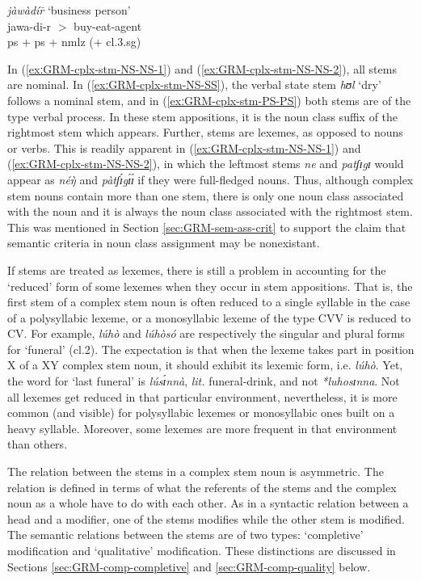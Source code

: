 \begin{exe}
\begin{exe}
\begin{exe}
{\begin{exe}
\begin{exe}
\begin{exe}
\begin{exe}
 \ex\label{exːGRM-cplx-stm-PS-PS}
 {\it jàwàdír̄} {\rm  `business person'} \\ %
jawa-di-r  $>$ {\sc buy-eat-agent} \\  %
 {\sc ps} + {\sc ps} + {\sc nmlz} (+ {\sc cl.3.sg})

 
\z 
 \z



In (\ref{exːGRM-cplx-stm-NS-NS-1}) and (\ref{exːGRM-cplx-stm-NS-NS-2}),  all 
stems are nominal. In (\ref{exːGRM-cplx-stm-NS-SS}),  the verbal state stem {\it 
hʊl} `dry'  follows a nominal stem,  and  in  (\ref{exːGRM-cplx-stm-PS-PS}) both 
stems are of the type verbal process.  In these stem appositions, it is the noun 
class suffix of the rightmost stem which appears. Further, stems are lexemes, as 
opposed to nouns or verbs.  This is readily apparent in  
(\ref{exːGRM-cplx-stm-NS-NS-1}) and (\ref{exːGRM-cplx-stm-NS-NS-2}), in which 
the leftmost stems {\it ne} and {\it patʃɪgɪ} would appear as {\it néŋ̀} and 
{\it pàtʃɪ́gɪ́ɪ́} if they were full-fledged nouns. Thus, although complex stem 
nouns contain more than one stem, there is only  one noun class associated with 
the noun and it is always the noun class associated with the rightmost stem.  
This was mentioned in Section \ref{sec:GRM-sem-ass-crit} to support the claim  
that semantic criteria in noun class assignment may be  nonexistant. 


If  stems are treated as lexemes, there is still a problem in accounting for the
 `reduced' form of  some lexemes when they occur in stem appositions. That
is, the first stem  of a complex stem noun is often reduced to a single
syllable in the case of a polysyllabic lexeme, or a monosyllabic lexeme of the
type CVV is reduced to CV. For
example,  {\it lúhò}  and  {\it lúhòsó} are respectively the singular and
plural forms for 
`funeral' ({\sc cl.2}).  The expectation is that
when the lexeme takes part in position X of a XY complex stem noun,
it should exhibit its lexemic form, i.e.   {\it lúhò}. Yet, the word for `last
funeral'  is {\it lúsɪ́nnà}, {\it lit.} funeral-drink,  and not {\it 
*luhosɪnna}.  Not all  lexemes get reduced in that particular 
environment, nevertheless, it is  more common (and visible)  for polysyllabic 
lexemes or
monosyllabic ones built on a heavy syllable. Moreover, some lexemes are more
frequent in that environment than others.


The relation between the stems in a complex stem noun is asymmetric.  The 
relation is defined in terms of what the referents of the stems and the complex 
noun as a whole have to do with each other.  As in a syntactic relation between 
a head and a modifier, one of the stems modifies while the other stem is 
modified. The semantic relations between the stems  are of two types: 
`completive' modification and  `qualitative' modification. These distinctions 
are discussed in  Sections \ref{sec:GRM-comp-completive} and 
\ref{sec:GRM-comp-quality} below.



\end{exe}
\end{exe}
\end{exe}
\end{exe}}
\end{exe}
\end{exe}
\end{exe}
